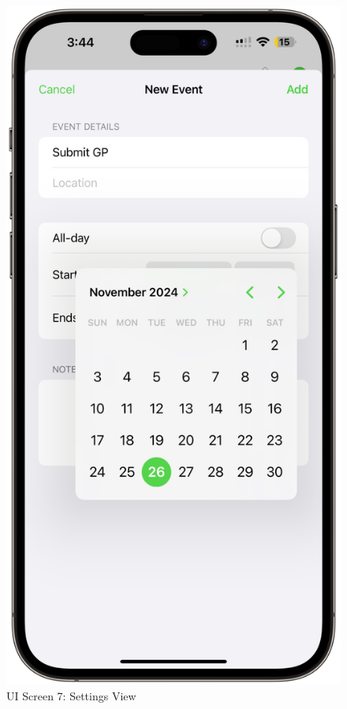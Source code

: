 \begin{figure}[!h]
    \begin{minipage}{0.3\textwidth}
        \centering
        \includegraphics[width=\textwidth]{images/screen7.png}
        \caption{UI Screen 7: Settings View}

\end{minipage}
\end{figure}
